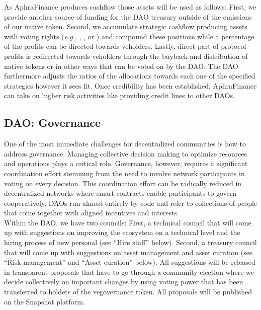 As AphraFinance produces cashflow those assets will be used as follows: First, we provide another source of funding for the DAO treasury outside of the emissions of our native token.
Second, we accumulate strategic cashflow producing assets with voting rights (\textit{e.g.}, \cvx,\cite{convex} \vader,\cite{vader} or \fxs\cite{frax}) and compound these positions while a percentage of the profits can be directed towards ve\aphra holders.
Lastly, direct part of protocol profits is redirected towards ve\aphra holders through the buyback and distribution of native tokens or in other ways that can be voted on by the DAO.
The DAO furthermore adjusts the ratios of the allocations towards each one of the specified strategies however it sees fit.
Once credibility has been established, AphraFinance can take on higher risk activities like providing credit lines to other DAOs.

\subsection{DAO: Governance}
\label{subsec:dao-governance}
One of the most immediate challenges for decentralized communities is how to address governance.
Managing collective decision making to optimize resources and operations plays a critical role.
Governance, however, requires a significant coordination effort stemming from the need to involve network participants in voting on every decision.
This coordination effort can be radically reduced in decentralized networks where smart contracts enable participants to govern cooperatively.
DAOs run almost entirely by code and refer to collections of people that come together with aligned incentives and interests.\\[-1em]

Within the DAO, we have two councils: First, a technical council that will come up with suggestions on improving the ecosystem on a technical level and the hiring process of new personal (see ``Hire staff'' below).
Second, a treasury council that will come up with suggestions on asset management and asset curation (see ``Risk management'' and ``Asset curation'' below).
All suggestions will be released in transparent proposals that have to go through a community election where we decide collectively on important changes by using voting power that has been transferred to holders of the ve\aphra governance token.
All proposals will be published on the Snapshot\cite{aphra-snapshot} platform.\\[-1em]

